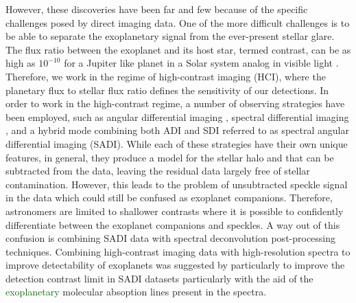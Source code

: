 \documentclass{aa}
\newcommand{\newchange}[1]{\textcolor{darkgreen}{#1}}
\begin{document}
However, these discoveries have been far and few because of the specific challenges posed by direct imaging data.
One of the more difficult challenges is to be able to separate the exoplanetary signal from the ever-present stellar glare.
The flux ratio between the exoplanet and its host star, termed contrast, can be as high as $10^{-10}$ for a Jupiter like planet in a Solar system analog in visible light \citep[ for e.g][]{2023Galicher}.
Therefore, we work in the regime of high-contrast imaging (HCI), where the planetary flux to stellar flux ratio defines the sensitivity of our detections.
In order to work in the high-contrast regime, a number of observing strategies have been employed, such as angular differential imaging \citep[ADI, ][]{2006MaroisADI}, spectral differential imaging \citep[SDI, ][]{2002SparksSDI}, and a hybrid mode combining both ADI and SDI referred to as spectral angular differential imaging (SADI).
While each of these strategies have their own unique features, in general, they produce a model for the stellar halo and that can be subtracted from the data, leaving the residual data largely free of stellar contamination.
However, this leads to the problem of unsubtracted speckle signal in the data which could still be confused as exoplanet companions.
Therefore, astronomers are limited to shallower contrasts where it is possible to confidently differentiate between the exoplanet companions and speckles.
A way out of this confusion is combining SADI data with spectral deconvolution post-processing techniques\cite[as for e.g. in, ][]{2002SparksSDI, 2007ThatteSDI}.
Combining high-contrast imaging data with high-resolution spectra to improve detectability of exoplanets was suggested by\cite{2015Snellen} particularly to improve the detection contrast limit in SADI datasets particularly with the aid of the \newchange{exoplanetary} molecular absoption lines present in the spectra.
\end{document}
